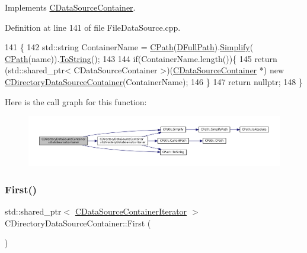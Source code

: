 Implements \hyperlink{classCDataSourceContainer_abebf1b9a6168b6783ee9753df612e511}{C\+Data\+Source\+Container}.



Definition at line 141 of file File\+Data\+Source.\+cpp.


\begin{DoxyCode}
141                                                                                                            
        \{
142     std::string ContainerName = \hyperlink{classCPath}{CPath}(\hyperlink{classCDirectoryDataSourceContainer_ac3d3c7e7d7bc9f68ba8a8747a3dee8b5}{DFullPath}).\hyperlink{classCPath_aa52dcb50c943a8abc8883db5ec43a45e}{Simplify}(
      \hyperlink{classCPath}{CPath}(name)).\hyperlink{classCPath_abbafaf377a7e38e0151bd9567d526951}{ToString}();
143     
144     \textcolor{keywordflow}{if}(ContainerName.length())\{
145         \textcolor{keywordflow}{return} (std::shared\_ptr< CDataSourceContainer >)(\hyperlink{classCDataSourceContainer}{CDataSourceContainer} *) \textcolor{keyword}{new} 
      \hyperlink{classCDirectoryDataSourceContainer_a62ef6d44201c6be66421b6c247f3b3bf}{CDirectoryDataSourceContainer}(ContainerName);
146     \}
147     \textcolor{keywordflow}{return} \textcolor{keyword}{nullptr};
148 \}
\end{DoxyCode}
Here is the call graph for this function\+:
\nopagebreak
\begin{figure}[H]
\begin{center}
\leavevmode
\includegraphics[width=350pt]{classCDirectoryDataSourceContainer_a71291ab0a549056fc784f0c553a8dc39_cgraph}
\end{center}
\end{figure}
\hypertarget{classCDirectoryDataSourceContainer_a32aa8888dbf78f5a2a1ddb5324aad0cf}{}\label{classCDirectoryDataSourceContainer_a32aa8888dbf78f5a2a1ddb5324aad0cf} 
\subsubsection{\texorpdfstring{First()}{First()}}
{\footnotesize\ttfamily std\+::shared\+\_\+ptr$<$ \hyperlink{classCDataSourceContainerIterator}{C\+Data\+Source\+Container\+Iterator} $>$ C\+Directory\+Data\+Source\+Container\+::\+First (\begin{DoxyParamCaption}{ }\end{DoxyParamCaption})\hspace{0.3cm}{\ttfamily [virtual]}}



